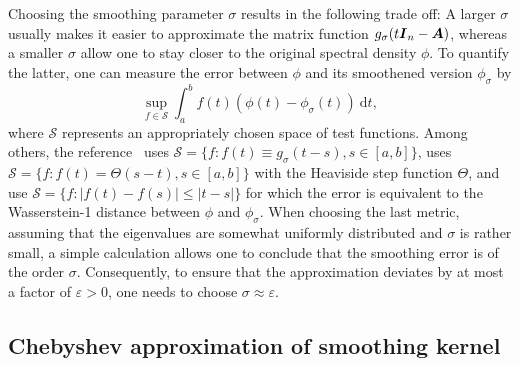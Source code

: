 Choosing the smoothing parameter $\sigma$ results in the following trade off: A larger $\sigma$ usually makes it  easier to approximate the matrix function $g_{\sigma}(t\boldsymbol{I}_n - \boldsymbol{A})$, whereas a smaller $\sigma$ allow one to stay closer to the original spectral density $\phi$. To quantify the latter, one can measure the error between $\phi$ and its smoothened version $\phi_{\sigma}$ by
\begin{equation}
    \sup_{f \in \mathcal{S}} \int_{a}^{b} f(t) (\phi(t) - \phi_{\sigma}(t))~\mathrm{d}t,
    \label{equ:error-metric}
\end{equation}
where $\mathcal{S}$ represents an appropriately chosen space of test functions. Among others, the reference~\cite{lin-2016-approximating-spectral} uses $\mathcal{S} = \{ f: f(t) \equiv g_{\sigma}(t - s), s \in [a, b]\}$, \cite{chen-2021-analysis-stochastic} uses $\mathcal{S} = \{f : f(t) = \Theta(s - t), s \in [a, b] \}$ with the Heaviside step function $\Theta$, and \cite{braverman-2022-sublinear-time,bhattacharjee-2025-improved-spectral} use $\mathcal{S} = \{f : |f(t) - f(s)| \leq |t - s| \}$ for which the error  is equivalent to the Wasserstein-1 distance between $\phi$ and $\phi_{\sigma}$.
When choosing 
the last metric,
assuming that the eigenvalues are somewhat uniformly distributed and $\sigma$ is rather small, a simple calculation allows one to conclude that the smoothing error  is of the order $\sigma$. Consequently, to ensure that the approximation deviates by at most a factor of $\varepsilon > 0$, one needs to choose $\sigma \approx \varepsilon$.

\subsection{Chebyshev approximation of smoothing kernel}
\label{subsec:chebyshev-approximation}

